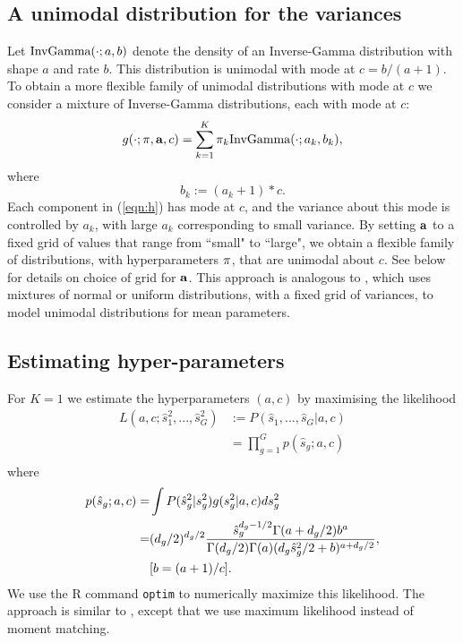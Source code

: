 \documentclass{bioinfo}
\begin{document}
\begin{methods}
\subsection{A unimodal distribution for the variances}
Let $\textrm{InvGamma}(\cdot;a,b)$ denote the density of an Inverse-Gamma distribution with shape $a$ and rate $b$. This distribution is unimodal with mode
at $c=b/(a+1)$. To obtain a more flexible family of unimodal distributions with mode at $c$ we consider a mixture of
Inverse-Gamma distributions, each with mode at $c$:
\begin{equation}
g(\cdot ; \mathbf \pi,\mathbf a,  c) = \sum\limits_{k=1}^K \pi_{k} \textrm{InvGamma}(\cdot;a_k,b_k), \label{eqn:h}
\end{equation}
where
\begin{equation}
b_k:=(a_k+1)*c. \label{eqn:b1}
\end{equation}
Each component in (\ref{eqn:h}) has mode at $c$, and the variance about this mode is controlled by $a_k$, with large $a_k$
corresponding to small variance. By setting $\mathbf a$ to a fixed grid of values that range from ``small" to ``large", we obtain a flexible
family of distributions, with hyperparameters $\mathbf \pi$, that are unimodal about $c$. See below for details on choice of grid for $\mathbf a$.
This approach is analogous to \citet{stephens2016ash}, which uses mixtures of normal or uniform distributions, with a fixed grid of variances,
to model unimodal distributions for mean parameters.

\subsection{Estimating hyper-parameters}

For $K=1$ we estimate the hyperparameters $(a,c)$ by maximising the likelihood
\begin{align}
L(a,c ; \hat{s}_1^2,..., \hat{s}_G^2) &:= P(\hat{s}_1,...,\hat{s}_G| a, c) \\
& = \prod\limits_{g=1}^G p(\hat{s}_g; a, c) \\
\end{align}
where
\begin{align}
p(\hat{s}_g; a,c) =&\int P(\hat{s}_g^2|s_g^2) g(s_g^2|a, c)ds_g^2 \\
=&(d_g/2)^{d_g/2}\frac{\hat{s}_g^{d_g-1/2}\Gamma(a+d_g/2)b^{a}}{\Gamma(d_g/2)\Gamma(a)(d_g\hat{s}_g^2/2+b)^{a+d_g/2}}, \label{eqn:ps} \\
 &[b=(a+1)/c].
\end{align}
We use the R command {\tt optim} to numerically maximize this likelihood.
The approach is similar to \citet{smyth2004limma}, except that
we use maximum likelihood instead of moment matching.


\end{methods}
\end{document}
